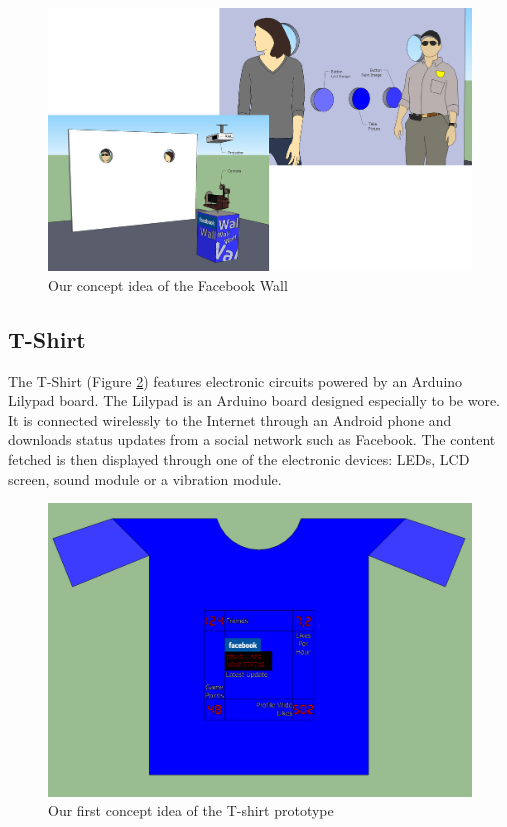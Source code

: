 \begin{figure}[h!]
\centering \includegraphics[scale=0.22]{img/prestudies-facebookwall}
\caption{Our concept idea of the Facebook Wall}
\label{fig:prestudies-facebookwall}
\end{figure}


\subsection{T-Shirt}
The T-Shirt (Figure \ref{fig:prestudies-tshirt})  features electronic circuits powered by an Arduino Lilypad board.
The Lilypad is an Arduino board designed especially to be wore. It is connected wirelessly to the Internet through
an Android phone and downloads status updates from a social network such as Facebook.
The content fetched is then displayed through one of the electronic devices: LEDs, LCD screen,
sound module or a vibration module.

\begin{figure}[h!]
\centering \includegraphics[scale=0.35]{img/prestudies-tshirt}
\caption{Our first concept idea of the T-shirt prototype}
\label{fig:prestudies-tshirt}
\end{figure}

